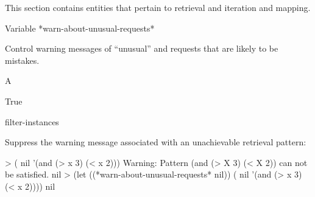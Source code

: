 \documentclass[10pt,twoside,english,pdftex]{article}
\begin{document}
This section contains  entities that pertain to
 retrieval and  iteration and
mapping.


\W\entities
\T\clearpage


\begin{functiondoc}{Variable}%
{*warn-about-unusual-requests*}{}%

\fnsyntax

\fnpurpose Control warning messages of ``unusual''
\textbf{} and \textbf{}
requests that are likely to be mistakes.

\fnpackage {}

\fnmodule {}

\fnvaluetype A 

\fninitialvalue True

\begin{alsos}{filter-instances}
\end{alsos}

\fnexample
Suppress the warning message associated with an unachievable retrieval pattern:
\begin{example}
> ( nil '(and (> x 3) (< x 2)))
Warning: Pattern (and (> X 3) (< X 2)) can not be satisfied.
nil
> (let ((*warn-about-unusual-requests* nil))
    ( nil '(and (> x 3) (< x 2))))
nil
\end{example}

\end{functiondoc}

\end{document}
